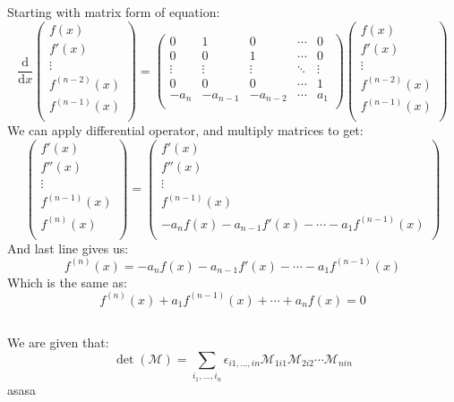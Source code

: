 \documentclass[12pt]{article}
\begin{document}
\subsection{}
Starting with matrix form of equation:
\begin{equation}
    \frac{\mathrm{d}}{\mathrm{d}x}
    \begin{pmatrix}
        f(x) \\
        f'(x) \\
        \vdots \\
        f^{(n-2)}(x) \\
        f^{(n-1)}(x) \\
    \end{pmatrix} = \begin{pmatrix}
        0 & 1 & 0 & \cdots  & 0 \\
        0 & 0 & 1 & \cdots  & 0 \\
        \vdots & \vdots & \vdots & \ddots & \vdots \\
        0 & 0 & 0 & \cdots & 1\\
        -a_n & -a_{n-1} & -a_{n-2} & \cdots & a_1\\ 
    \end{pmatrix}
    \begin{pmatrix}
        f(x) \\
        f'(x) \\
        \vdots \\
        f^{(n-2)}(x) \\
        f^{(n-1)}(x) \\
    \end{pmatrix}
\end{equation}
We can apply differential operator, and multiply matrices to get:
\begin{equation}
    \begin{pmatrix}
        f'(x) \\
        f''(x) \\
        \vdots \\
        f^{(n-1)}(x) \\
        f^{(n)}(x) \\
    \end{pmatrix}  = 
    \begin{pmatrix}
        f'(x) \\
        f''(x) \\
        \vdots \\
        f^{(n-1)}(x) \\
        -a_n f(x) - a_{n-1} f'(x) - \cdots - a_1 f^{(n-1)}(x) \\
    \end{pmatrix}
\end{equation}
And last line gives us:
\begin{equation}
    f^{(n)}(x) = -a_n f(x) - a_{n-1} f'(x) - \cdots - a_1 f^{(n-1)}(x)
\end{equation}
Which is the same as:
\begin{equation}
    f^{(n)}(x) + a_1 f^{(n-1)}(x) + \cdots + a_n f(x) = 0
\end{equation}
\subsection{}
We are given that:
\begin{equation}
    \det(\mathcal{M}) = \sum_{i_1,...,i_n}\epsilon_{i1,...,in}\mathcal{M}_{1i1}\mathcal{M}_{2i2}\cdots\mathcal{M}_{nin}
\end{equation}
asasa
\end{document}
